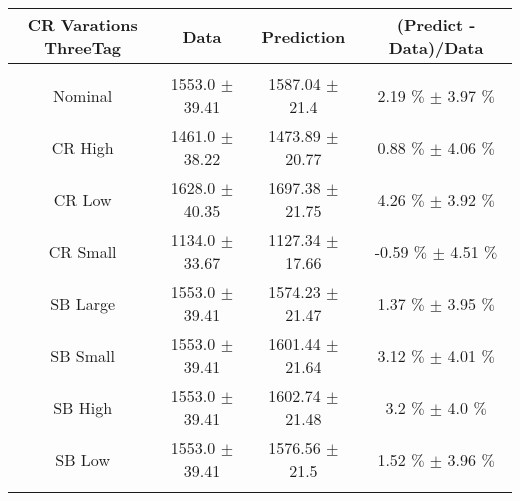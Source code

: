 \begin{footnotesize} 
\begin{tabular}{c|c|c|c} 
CR Varations ThreeTag & Data & Prediction & (Predict - Data)/Data \\ 
\hline\hline 
& & & \\ 
Nominal & 1553.0 $\pm$ 39.41 & 1587.04 $\pm$ 21.4 & 2.19 $\%$  $\pm$ 3.97 $\%$ \\ 
\hline 
CR High & 1461.0 $\pm$ 38.22 & 1473.89 $\pm$ 20.77 & 0.88 $\%$  $\pm$ 4.06 $\%$ \\ 
\hline 
CR Low & 1628.0 $\pm$ 40.35 & 1697.38 $\pm$ 21.75 & 4.26 $\%$  $\pm$ 3.92 $\%$ \\ 
\hline 
CR Small & 1134.0 $\pm$ 33.67 & 1127.34 $\pm$ 17.66 & -0.59 $\%$  $\pm$ 4.51 $\%$ \\ 
\hline 
SB Large & 1553.0 $\pm$ 39.41 & 1574.23 $\pm$ 21.47 & 1.37 $\%$  $\pm$ 3.95 $\%$ \\ 
\hline 
SB Small & 1553.0 $\pm$ 39.41 & 1601.44 $\pm$ 21.64 & 3.12 $\%$  $\pm$ 4.01 $\%$ \\ 
\hline 
SB High & 1553.0 $\pm$ 39.41 & 1602.74 $\pm$ 21.48 & 3.2 $\%$  $\pm$ 4.0 $\%$ \\ 
\hline 
SB Low & 1553.0 $\pm$ 39.41 & 1576.56 $\pm$ 21.5 & 1.52 $\%$  $\pm$ 3.96 $\%$ \\ 
& & & \\ 
\hline\hline 
\end{tabular} 
\end{footnotesize} 
\newline 
